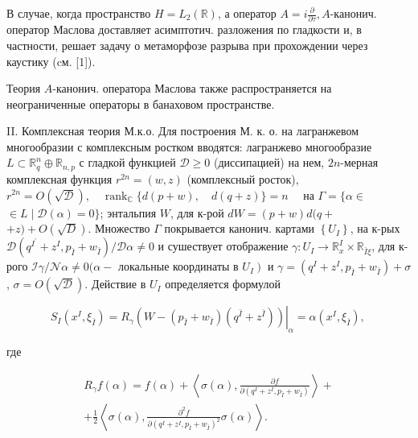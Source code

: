 \documentclass[10pt]{article}
\begin{document}
В случае, когда пространство $H=L_{2}(\mathbb{R})$, а оператор $A=i \frac{\partial}{\partial \tau}, A$-канонич. оператор Маслова доставляет асимптотич. разложения по гладкости и, в частности, решает задачу о метаморфозе разрыва при прохождении через каустику (cм. [1]).



Теория $A$-канонич. оператора Маслова также распространяется на неограниченные операторы в банаховом пространстве.



II. Комплексная теория М.к.о. Для построения М. к. о. на лагранжевом многообразии с комплексным ростком вводятся: лагранжево многообразие $L \subset \mathbb{R}_{q}^{n} \oplus \mathbb{R}_{n, p}$ с гладкой функцией $\mathscr{D} \geqslant 0$ (диссипацией) на нем, $2 n$-мерная комплексная функция $r^{2 n}=(w, z)$ (комплексный росток), $r^{2 n}=O(\sqrt{\mathscr{D}}), \quad \operatorname{rank}_{\mathbb{C}}\{d(p+w), \quad d(q+z)\}=n \quad$ на $\Gamma=\{\alpha \in$ $\in L \mid \mathscr{D}(\alpha)=0\}$; энтальпия $W$, для к-рой $d W=(p+w) d(q+$ $+z)+O(\sqrt{D})$. Множество $\Gamma$ покрывается канонич. картами $\left\{U_{I}\right\}$, на к-рых $\mathscr{D}\left(q^{I^{\prime}}+z^{I}, p_{\bar{I}}+w_{\bar{I}}\right) / \mathscr{D} \alpha \neq 0$ и сушествует отображение $\gamma: U_{I} \rightarrow \mathbb{R}_{x}^{I} \times \mathbb{R}_{\bar{I} \xi}$, для к-рого $\mathscr{I} \gamma / \mathscr{\mathscr { N } \alpha \neq 0}(\alpha-$ локальные координаты в $\left.U_{I}\right)$ и $\gamma=\left(q^{I}+z^{I}, p_{\bar{I}}+w_{\bar{I}}\right)+\sigma$, $\sigma=O(\sqrt{\mathscr{D}})$. Действие в $U_{I}$ определяется формулой



\[

S_{I}\left(x^{I}, \xi_{\bar{I}}\right)=\left.R_{\gamma}\left(W-\left(p_{\bar{I}}+w_{\bar{I}}\right)\left(q^{\bar{I}}+z^{\bar{I}}\right)\right)\right|_{\alpha}=\alpha\left(x^{I}, \xi_{\bar{I}}\right) \text {, }

\]



где



\[

\begin{gathered}

R_{\gamma} f(\alpha)=f(\alpha)+\left\langle\sigma(\alpha), \frac{\partial f}{\partial\left(q^{I}+z^{I}, p_{\bar{I}}+w_{\bar{I}}\right)}\right\rangle+ \\

+\frac{1}{2}\left\langle\sigma(\alpha), \frac{\partial^{2} f}{\partial\left(q^{I}+z^{I}, p_{\bar{I}}+w_{\bar{I}}\right)^{2}} \sigma(\alpha)\right\rangle .

\end{gathered}

\]
\end{document}
